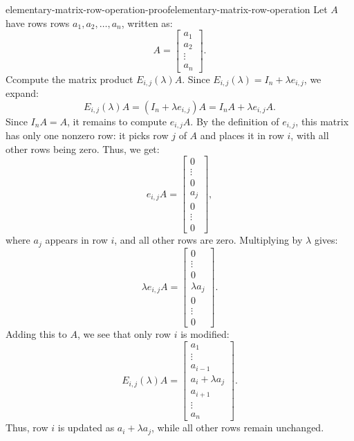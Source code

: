 \documentclass[preview]{standalone}
\begin{document}
\begin{snippetproof}{elementary-matrix-row-operation-proof}{elementary-matrix-row-operation}{}
    Let \(A\) have rows rows \(a_1, a_2, \dots, a_n\), written as:
    \[
        A =
        \begin{bmatrix}
        a_1 \\ a_2 \\ \vdots \\ a_n
        \end{bmatrix}.
    \]
    Ccompute the matrix product \(E_{i,j}(\lambda) A\).
    Since \(E_{i,j}(\lambda) = I_n + \lambda e_{i,j}\), we expand:
    \[
        E_{i,j}(\lambda) A = (I_n + \lambda e_{i,j}) A = I_n A + \lambda e_{i,j} A.
    \]
    Since \(I_n A = A\), it remains to compute \(e_{i,j} A\).
    By the definition of \(e_{i,j}\), this matrix has only one nonzero row: it picks row \(j\) of \(A\)
    and places it in row \(i\), with all other rows being zero. Thus, we get:
    \[
        e_{i,j} A =
        \begin{bmatrix}
        0 \\ \vdots \\ 0 \\ a_j \\ 0 \\ \vdots \\ 0
        \end{bmatrix},
    \]
    where \(a_j\) appears in row \(i\), and all other rows are zero.
    Multiplying by \(\lambda\) gives:
    \[
        \lambda e_{i,j} A =
        \begin{bmatrix}
        0 \\ \vdots \\ 0 \\ \lambda a_j \\ 0 \\ \vdots \\ 0
        \end{bmatrix}.
    \]
    Adding this to \(A\), we see that only row \(i\) is modified:
    \[
        E_{i,j}(\lambda) A =
        \begin{bmatrix}
        a_1 \\ \vdots \\ a_{i-1} \\ a_i + \lambda a_j \\ a_{i+1} \\ \vdots \\ a_n
        \end{bmatrix}.
    \]
    Thus, row \(i\) is updated as \(a_i + \lambda a_j\), while all other rows remain unchanged.
\end{snippetproof}
\end{document}
